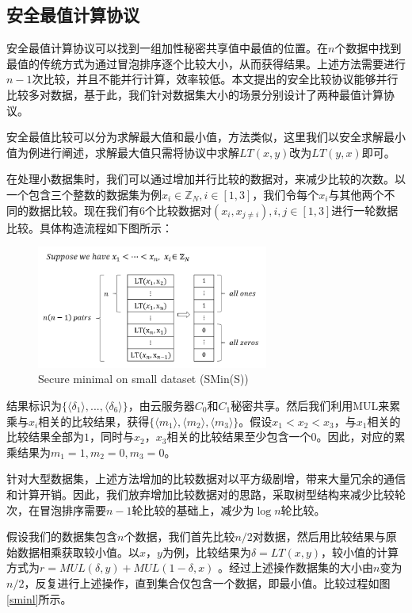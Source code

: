 \subsection{安全最值计算协议}
安全最值计算协议可以找到一组加性秘密共享值中最值的位置。在$n$个数据中找到最值的传统方式为通过冒泡排序逐个比较大小，从而获得结果。上述方法需要进行$n-1$次比较，并且不能并行计算，效率较低。本文提出的安全比较协议能够并行比较多对数据，基于此，我们针对数据集大小的场景分别设计了两种最值计算协议。

安全最值比较可以分为求解最大值和最小值，方法类似，这里我们以安全求解最小值为例进行阐述，求解最大值只需将协议中求解$LT(x,y)$改为$LT(y,x)$即可。

在处理小数据集时，我们可以通过增加并行比较的数据对，来减少比较的次数。以一个包含三个整数的数据集为例$x_i \in \mathbb{Z}_N, i\in[1,3]$，我们令每个$x_i$与其他两个不同的数据比较。现在我们有6个比较数据对$(x_i, x_{j\neq i}), i,j \in [1,3] $进行一轮数据比较。具体构造流程如下图所示：

\begin{figure}[htbp]
    \centering
    \includegraphics[width=3in]{img/fig4.png}%
    \caption{Secure minimal on small dataset (SMin(S))}
    \label{smins}
\end{figure}

结果标识为$\{\langle\delta_1\rangle,...,\langle\delta_6\rangle\}$，由云服务器$C_0$和$C_1$秘密共享。然后我们利用MUL来累乘与$x_i$相关的比较结果，获得$\{\langle m_1 \rangle,\langle m_2 \rangle,\langle m_3\rangle\}$。假设$x_1<x_2<x_3$，与$x_1$相关的比较结果全部为$1$，同时与$x_2$，$x_3$相关的比较结果至少包含一个$0$。因此，对应的累乘结果为$m_1=1, m_2=0, m_3=0$。

针对大型数据集，上述方法增加的比较数据对以平方级剧增，带来大量冗余的通信和计算开销。因此，我们放弃增加比较数据对的思路，采取树型结构来减少比较轮次，在冒泡排序需要$n-1$轮比较的基础上，减少为$\log n$轮比较。

假设我们的数据集包含$n$个数据，我们首先比较$n/2$对数据，然后用比较结果与原始数据相乘获取较小值。以$x$，$y$为例，比较结果为$\delta = LT(x,y) $，较小值的计算方式为$r=MUL(\delta, y) + MUL(1-\delta, x)$ 。经过上述操作数据集的大小由$n$变为$n/2$，反复进行上述操作，直到集合仅包含一个数据，即最小值。比较过程如图\ref{sminl}所示。

